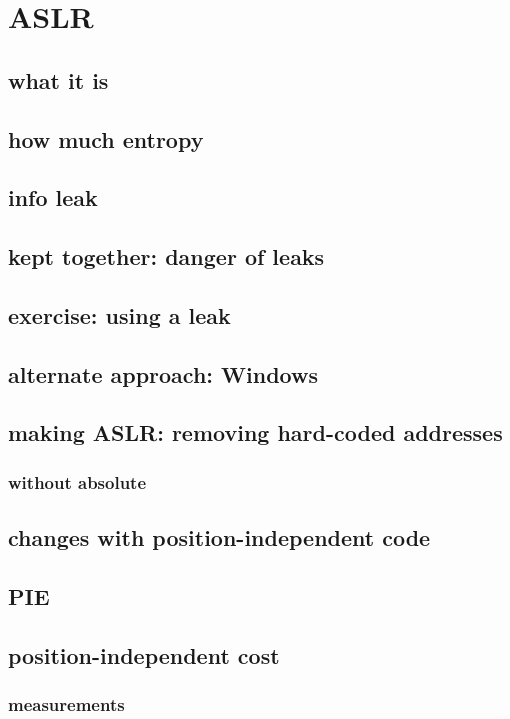

\section{ASLR}
\subsection{what it is}


\subsection{how much entropy}


\subsection{info leak}


\subsection{kept together: danger of leaks}


\subsection{exercise: using a leak}



\subsection{alternate approach: Windows}


\subsection{making ASLR: removing hard-coded addresses}


\subsubsection{without absolute}


\subsection{changes with position-independent code}


\subsection{PIE}


\subsection{position-independent cost}


\subsubsection{measurements}

